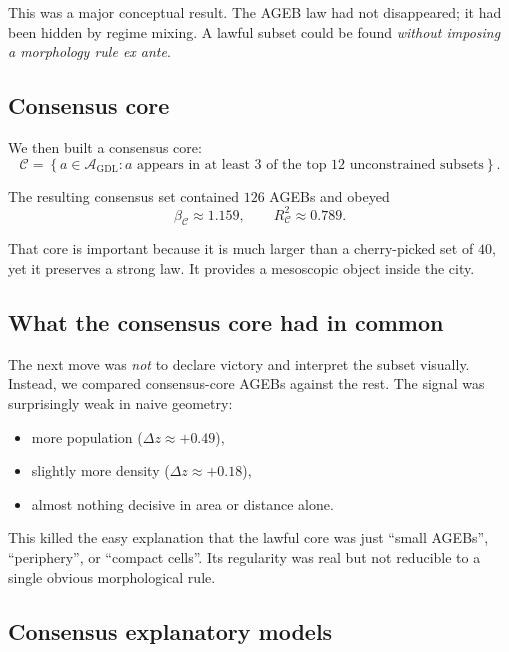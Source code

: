\documentclass[11pt]{article}
\begin{document}
This was a major conceptual result. The AGEB law had not disappeared; it had been hidden by regime mixing. A lawful subset could be found \emph{without imposing a morphology rule ex ante}.

\subsection{Consensus core}

We then built a consensus core:
\begin{equation}
\mathcal{C}
=
\left\{
a \in \mathcal{A}_{\mathrm{GDL}} :
a \text{ appears in at least 3 of the top 12 unconstrained subsets}
\right\}.
\end{equation}

The resulting consensus set contained \(126\) AGEBs and obeyed
\begin{equation}
\beta_{\mathcal{C}} \approx 1.159,
\qquad
R^2_{\mathcal{C}} \approx 0.789.
\end{equation}

That core is important because it is much larger than a cherry-picked set of \(40\), yet it preserves a strong law. It provides a mesoscopic object inside the city.

\subsection{What the consensus core had in common}

The next move was \emph{not} to declare victory and interpret the subset visually. Instead, we compared consensus-core AGEBs against the rest. The signal was surprisingly weak in naive geometry:
\begin{itemize}
\item more population (\(\Delta z \approx +0.49\)),
\item slightly more density (\(\Delta z \approx +0.18\)),
\item almost nothing decisive in area or distance alone.
\end{itemize}

This killed the easy explanation that the lawful core was just ``small AGEBs'', ``periphery'', or ``compact cells''. Its regularity was real but not reducible to a single obvious morphological rule.

\subsection{Consensus explanatory models}
\end{document}
